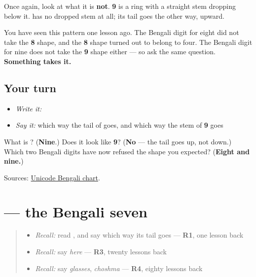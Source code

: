 Once again, look at what it is \textbf{not}. \textbf{9} is a ring with a straight stem dropping below it. \textbf{} has no dropped stem at all; its tail goes the other way, upward.

You have seen this pattern one lesson ago. The Bengali digit for eight did not take the \textbf{8} shape, and the \textbf{8} shape turned out to belong to four. The Bengali digit for nine does not take the \textbf{9} shape either — so ask the same question. \textbf{Something takes it.}

\subsection*{Your turn}
\begin{itemize}
\raggedright
  \item \emph{Write it:} 
  \item \emph{Say it:} which way the tail of \textbf{} goes, and which way the stem of \textbf{9} goes
\end{itemize}

\begin{tcolorbox}[breakable,colback=teal!4,colframe=teal!35!black,title={Before you move on}]
What is \textbf{}? (\textbf{Nine}.) Does it look like \textbf{9}? (\textbf{No} — the tail goes up, not down.) Which two Bengali digits have now refused the shape you expected? (\textbf{Eight and nine.})

Sources: \href{https://www.unicode.org/charts/PDF/U0980.pdf}{Unicode Bengali chart}.
\end{tcolorbox}
\section[\texorpdfstring{\bn{৭} (digit seven)}{৭ (digit seven)}]{ — the Bengali seven}

\label{lesson:BN-W07-digit-seven}



\begin{quote}
\begin{itemize}
\raggedright
  \item \emph{Recall:} read \textbf{}, and say which way its tail goes — \textbf{R1}, one lesson back
  \item \emph{Recall:} say \emph{here} — \textbf{R3}, twenty lessons back
  \item \emph{Recall:} say \emph{glasses}, \emph{choshma} — \textbf{R4}, eighty lessons back
\end{itemize}
\end{quote}

